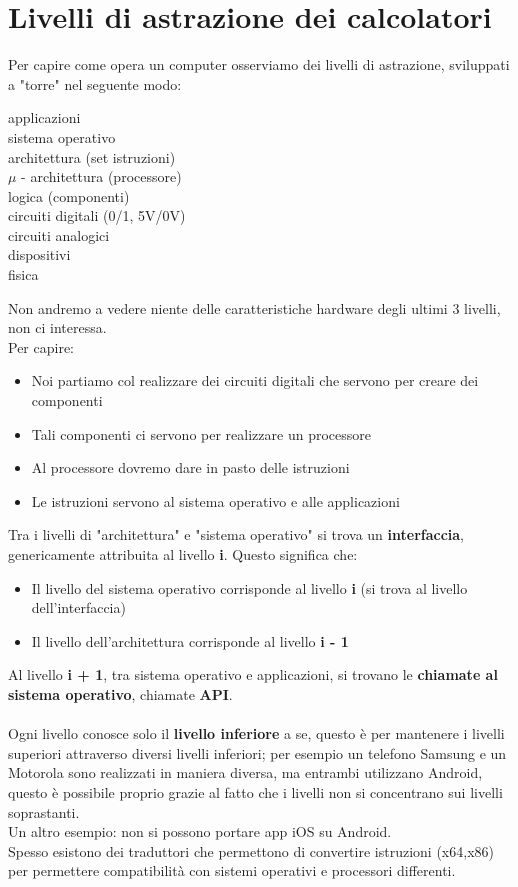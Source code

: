 \documentclass[12pt,a4paper]{article}
\let\oldsection\section
\renewcommand{\section}{\clearpage\oldsection}
\begin{document}
\section{Livelli di astrazione dei calcolatori}
Per capire come opera un computer osserviamo dei livelli di astrazione, sviluppati a "torre" nel seguente modo:
\begin{center}
    applicazioni\\
    sistema operativo\\
    architettura (set istruzioni)\\
    $\mu$ - architettura (processore)\\
    logica (componenti)\\
    circuiti digitali (0/1, 5V/0V)\\
    circuiti analogici\\
    dispositivi\\
    fisica
\end{center}
Non andremo a vedere niente delle caratteristiche hardware degli ultimi 3 livelli, non ci interessa.\\
Per capire:
\begin{itemize}
    \item Noi partiamo col realizzare dei circuiti digitali che servono per creare dei componenti
    \item Tali componenti ci servono per realizzare un processore
    \item Al processore dovremo dare in pasto delle istruzioni
    \item Le istruzioni servono al sistema operativo e alle applicazioni
\end{itemize}
Tra i livelli di "architettura" e "sistema operativo" si trova un \textbf{interfaccia}, genericamente attribuita al livello \textbf{i}. Questo significa che:
\begin{itemize}
    \item Il livello del sistema operativo corrisponde al livello \textbf{i} (si trova al livello dell'interfaccia)
    \item Il livello dell'architettura corrisponde al livello \textbf{i - 1}
\end{itemize}
Al livello \textbf{i + 1}, tra sistema operativo e applicazioni, si trovano le \textbf{chiamate al sistema operativo}, chiamate \textbf{API}.\\\\
Ogni livello conosce solo il \textbf{livello inferiore} a se, questo è per mantenere i livelli superiori attraverso diversi livelli inferiori; per esempio un telefono Samsung e un Motorola sono realizzati in maniera diversa, ma entrambi utilizzano Android, questo è possibile proprio grazie al fatto che i livelli non si concentrano sui livelli soprastanti.\\
Un altro esempio: non si possono portare app iOS su Android.\\
Spesso esistono dei traduttori che permettono di convertire istruzioni (x64,x86) per permettere compatibilità con sistemi operativi e processori differenti.
\end{document}
